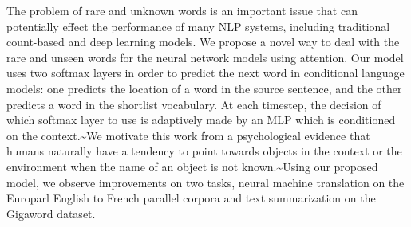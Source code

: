 The problem of rare and unknown words is an important issue that can potentially effect the performance of many NLP systems, including traditional count-based and deep learning models. We propose a novel way to deal with the rare and unseen words for the neural network models using attention. Our model uses two softmax layers in order to predict the next word in conditional language models: one predicts the location of a word in the source sentence, and the other predicts a word in the shortlist vocabulary. At each timestep, the decision of which softmax layer to use is adaptively made by an MLP which is conditioned on the context.{\textasciitilde}We motivate this work from a psychological evidence that humans naturally have a tendency to point towards objects in the context or the environment when the name of an object is not known.{\textasciitilde}Using our proposed model, we observe improvements on two tasks, neural machine translation on the Europarl English to French parallel corpora and text summarization on the Gigaword dataset.
